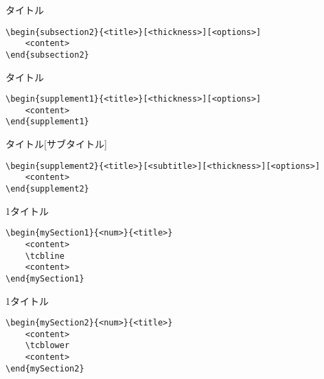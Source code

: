\documentclass[xelatex,ja=standard,b5j,8pt,magstyle=nomag*,japaram={units}]{bxjsarticle}
\begin{document}
\begin{multicols}{2}
\begin{subsection2}{タイトル}
\end{subsection2}
\columnbreak
\begin{lstlisting}
\begin{subsection2}{<title>}[<thickness>][<options>]
    <content>
\end{subsection2}
\end{lstlisting}
\end{multicols}

\begin{multicols}{2}
\begin{supplement1}{タイトル}
\end{supplement1}
\columnbreak
\begin{lstlisting}
\begin{supplement1}{<title>}[<thickness>][<options>]
    <content>
\end{supplement1}
\end{lstlisting}
\end{multicols}

\begin{multicols}{2}
    \begin{supplement2}{タイトル}[サブタイトル]
\end{supplement2}
\columnbreak
\begin{lstlisting}
\begin{supplement2}{<title>}[<subtitle>][<thickness>][<options>]
    <content>
\end{supplement2}
\end{lstlisting}
\end{multicols}

\newpage
\begin{multicols}{2}
\begin{mySection1}{1}{タイトル}
    \tcbline
\end{mySection1}
\columnbreak
\begin{lstlisting}
\begin{mySection1}{<num>}{<title>}
    <content>
    \tcbline
    <content>
\end{mySection1}
\end{lstlisting}
\end{multicols}

\begin{multicols}{2}
\begin{mySection2}{1}{タイトル}
    \tcblower
\end{mySection2}
\columnbreak
\begin{lstlisting}
\begin{mySection2}{<num>}{<title>}
    <content>
    \tcblower
    <content>
\end{mySection2}
\end{lstlisting}
\end{multicols}
\end{document}
